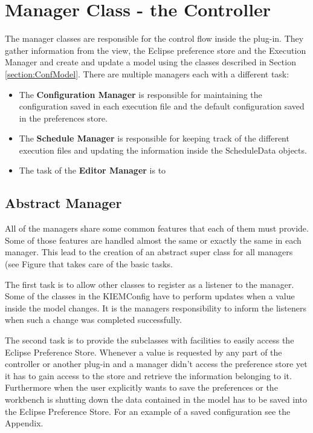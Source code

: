 \section{Manager Class - the Controller}
\label{section:ConfController}
The manager classes are responsible for the control flow inside the plug-in. They gather information
from the view, the Eclipse preference store and the Execution Manager and create and update a
model using the classes described in Section \ref{section:ConfModel}. There are multiple managers
each with a different task:
\begin{itemize}
 \item The \textbf{Configuration Manager} is responsible for maintaining the configuration saved in
each execution file and the default configuration saved in the preferences store.
 \item The \textbf{Schedule Manager} is responsible for keeping track of the different
execution files and updating the information inside the ScheduleData objects.
 \item The task of the \textbf{Editor Manager} is to
\end{itemize}



\subsection{Abstract Manager}
\label{section:AbstractManager}
All of the managers share some common features that each of them must provide. Some of those
features are handled almost the same or exactly the same in each manager. This lead to the creation
of an abstract super class for all managers (see Figure  %
that takes care of the basic tasks.

The first task is to allow other classes to register as a listener to the manager. Some of the classes
in the \ac{KIEMConfig} have to perform updates when a value inside the model changes. It is the managers
responsibility to inform the listeners when such a change was completed successfully.

The second task is to provide the subclasses with facilities to easily access the Eclipse Preference Store.
Whenever a value is requested by any part of the controller or another plug-in and a manager didn't access
the preference store yet it has to gain access to the store and retrieve the information belonging to it.
Furthermore when the user explicitly wants to save the preferences or the workbench is shutting down the
data contained in the model has to be saved into the Eclipse Preference Store. For an example of a 
saved configuration see the Appendix.



